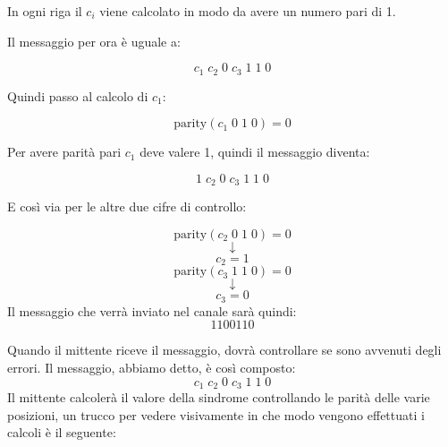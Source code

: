 In ogni riga il $c_i$ viene calcolato in modo da avere un numero pari di 1.

Il messaggio per ora è uguale a:

\begin{equation*}
c_1 \; c_2 \; 0 \; c_3 \; 1 \; 1 \; 0
\end{equation*}

Quindi passo al calcolo di $c_1$:

\begin{equation*}
\text{parity}(c_1 \; 0 \; 1 \; 0) = 0
\end{equation*}

Per avere parità pari $c_1$ deve valere 1, quindi il messaggio diventa:

\begin{equation*}
1 \; c_2 \; 0 \; c_3 \; 1 \; 1 \; 0
\end{equation*}

E così via per le altre due cifre di controllo:

\begin{equation*}
\text{parity}(c_2 \; 0 \; 1 \; 0) = 0
\end{equation*}
\begin{equation*}
\downarrow
\end{equation*}
\begin{equation*}
c_2 = 1
\end{equation*}
\vspace{5mm}
\begin{equation*}
\text{parity}(c_3 \; 1 \; 1 \; 0) = 0
\end{equation*}
\begin{equation*}
\downarrow
\end{equation*}
\begin{equation*}
c_3 = 0
\end{equation*}
Il messaggio che verrà inviato nel canale sarà quindi:
\begin{equation*}
1100110
\end{equation*}

Quando il mittente riceve il messaggio, dovrà controllare se sono avvenuti degli errori.
Il messaggio, abbiamo detto, è così composto:
\begin{equation*}
c_1 \; c_2 \; 0 \; c_3 \; 1 \; 1 \; 0
\end{equation*}
Il mittente calcolerà il valore della sindrome controllando le parità delle varie posizioni, un trucco per vedere visivamente in che modo vengono effettuati i calcoli è il seguente:

